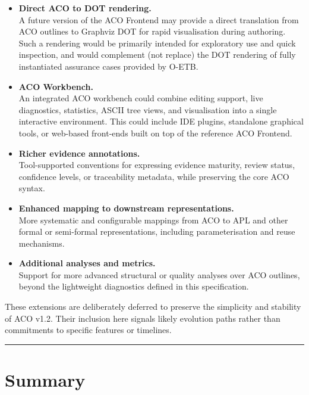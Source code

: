 \documentclass[11pt]{article}
\begin{document}
\begin{itemize}[leftmargin=2em]
  \item \textbf{Direct ACO to DOT rendering.} \\
        A future version of the ACO Frontend may provide a direct translation
        from ACO outlines to Graphviz DOT for rapid visualisation during
        authoring. Such a rendering would be primarily intended for exploratory
        use and quick inspection, and would complement (not replace) the DOT
        rendering of fully instantiated assurance cases provided by O-ETB.

  \item \textbf{ACO Workbench.} \\
        An integrated ACO workbench could combine editing support, live
        diagnostics, statistics, ASCII tree views, and visualisation into a
        single interactive environment. This could include IDE plugins,
        standalone graphical tools, or web-based front-ends built on top of the
        reference ACO Frontend.

  \item \textbf{Richer evidence annotations.} \\
        Tool-supported conventions for expressing evidence maturity, review
        status, confidence levels, or traceability metadata, while preserving
        the core ACO syntax.

  \item \textbf{Enhanced mapping to downstream representations.} \\
        More systematic and configurable mappings from ACO to APL and other
        formal or semi-formal representations, including parameterisation and
        reuse mechanisms.

  \item \textbf{Additional analyses and metrics.} \\
        Support for more advanced structural or quality analyses over ACO
        outlines, beyond the lightweight diagnostics defined in this
        specification.
\end{itemize}

These extensions are deliberately deferred to preserve the simplicity and
stability of ACO v1.2. Their inclusion here signals likely evolution paths
rather than commitments to specific features or timelines.

\bigskip
\hrule
\bigskip

\section{Summary}
\end{document}
